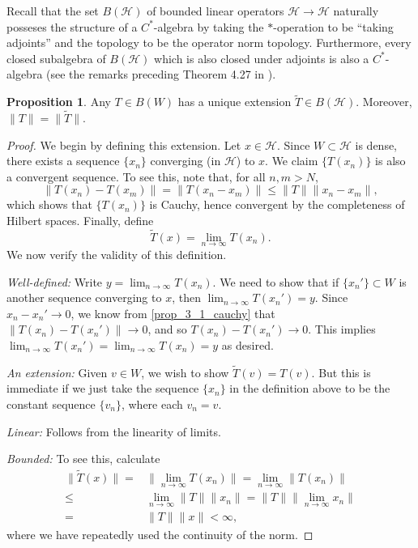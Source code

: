 \documentclass{dcthesis}
\numberwithin{equation}{section}
\numberwithin{equation}{section}
\theoremstyle{definition}
\newtheorem{proposition}[equation]{Proposition}
\begin{document}
Recall that the set $B(\mathcal{H})$ of bounded linear operators $\mathcal{H}\to\mathcal{H}$ naturally posseses the structure of a $C^\ast$-algebra by taking the $\ast$-operation to be ``taking adjoints'' and the topology to be the operator norm topology. Furthermore, every closed subalgebra of $B(\mathcal{H})$ which is also closed under adjoints is also a $C^\ast$-algebra (see the remarks preceding Theorem 4.27 in \cite{douglas_1998}). 

\begin{proposition}
\label{prop_extension}
	Any $T\in B(W)$ has a unique extension $\tilde{T}\in B(\mathcal{H})$. Moreover, $\|T\|=\|\tilde{T}\|$.
\end{proposition}
\begin{proof}
	We begin by defining this extension. Let $x\in\mathcal{H}$. Since $W\subset\mathcal{H}$ is dense, there exists a sequence $\{x_n\}$ converging (in $\mathcal{H}$) to $x$. We claim $\{T(x_n)\}$ is also a convergent sequence. To see this, note that, for all $n,m>N$,
	\begin{equation*}
	\label{prop_3_1_cauchy}
		\|T(x_n) - T(x_m)\|=\|T(x_n-x_m)\|\leq\|T\|\|x_n-x_m\|,
	\end{equation*}
	which shows that $\{T(x_n)\}$ is Cauchy, hence convergent by the completeness of Hilbert spaces. Finally, define 
	\begin{equation*}
		\tilde{T}(x) = \lim_{n\to\infty}T(x_n).
	\end{equation*}
	We now verify the validity of this definition.

	\textit{Well-defined:} Write $y=\lim_{n\to\infty} T(x_n)$. We need to show that if $\{x_n'\}\subset W$ is another sequence converging to $x$, then $\lim_{n\to\infty}T(x_n')=y$. Since $x_n-x_n'\to 0$, we know from \ref{prop_3_1_cauchy} that $\|T(x_n)-T(x_n')\|\to 0$, and so $T(x_n)-T(x_n')\to 0$. This implies $\lim_{n\to\infty}T(x_n')=\lim_{n\to\infty}T(x_n)=y$ as desired.

	\textit{An extension:} Given $v\in W$, we wish to show $\tilde{T}(v)=T(v)$. But this is immediate if we just take the sequence $\{x_n\}$ in the definition above to be the constant sequence $\{v_n\}$, where each $v_n=v$.

	\textit{Linear:} Follows from the linearity of limits.

	\textit{Bounded:} To see this, calculate
	\begin{align*}
		\|\tilde{T}(x)\| =& \|\lim_{n\to\infty}T(x_n)\| = \lim_{n\to\infty} \|T(x_n)\| \\
		\leq& \lim_{n\to\infty} \|T\|\|x_n\| = \|T\|\|\lim_{n\to\infty} x_n\| \\
		=& \|T\|\|x\| < \infty,
	\end{align*}
	where we have repeatedly used the continuity of the norm.


\end{proof}
\end{document}
